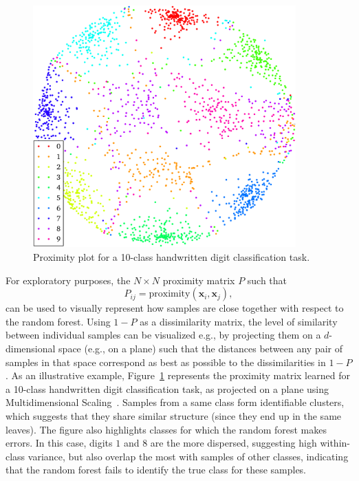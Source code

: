 \begin{figure}
    \centering
    \includegraphics[width=0.9\textwidth]{figures/ch4_proximity_plot.pdf}
    \caption{Proximity plot for a 10-class handwritten digit classification task.}
    \label{fig:proximity-plot}
\end{figure}

For exploratory purposes, the $N\times N$ proximity matrix $P$ such that
\begin{equation}
P_{ij} = \text{proximity}(\mathbf{x}_i, \mathbf{x}_j),
\end{equation}
can be used to visually represent how samples are close together with respect
to the random forest. Using $1-P$ as a dissimilarity matrix,  the level of
similarity between individual samples can be visualized e.g., by projecting them
on a $d$-dimensional space (e.g., on a plane) such that the distances
between any pair of samples in that space correspond as best as possible to the
dissimilarities in $1-P$. As an illustrative example, Figure~\ref{fig:proximity-plot}
represents the proximity matrix learned for a 10-class handwritten digit
classification task, as projected on a plane using Multidimensional Scaling~\citep{kruskal:1964}.
Samples from a same class form identifiable clusters, which suggests that
they share similar structure (since they end up in the same leaves). The figure
also highlights classes for which the random forest makes errors. In this case,
digits $1$ and $8$ are the more dispersed, suggesting high within-class variance,
but also overlap the most with samples of other classes, indicating
that the random forest fails to identify the true class for these samples.


